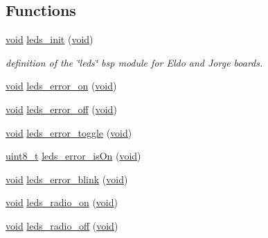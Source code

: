 \subsection*{Functions}
\begin{DoxyCompactItemize}
\item 
\hyperlink{usb__devapi_8h_afabf60e7f57651d6d595a02c75f07cd0}{void} \hyperlink{group__leds_ga67cfc3137a465e560792490e81365254}{leds\+\_\+init} (\hyperlink{usb__devapi_8h_afabf60e7f57651d6d595a02c75f07cd0}{void})
\begin{DoxyCompactList}\small\item\em definition of the \char`\"{}leds\char`\"{} bsp module for Eldo and Jorge boards. \end{DoxyCompactList}\item 
\hyperlink{usb__devapi_8h_afabf60e7f57651d6d595a02c75f07cd0}{void} \hyperlink{group__leds_ga248d93c2ed295c1c463984b881e1b9af}{leds\+\_\+error\+\_\+on} (\hyperlink{usb__devapi_8h_afabf60e7f57651d6d595a02c75f07cd0}{void})
\item 
\hyperlink{usb__devapi_8h_afabf60e7f57651d6d595a02c75f07cd0}{void} \hyperlink{group__leds_ga4639337fca09b91f2136c2843a19e1b3}{leds\+\_\+error\+\_\+off} (\hyperlink{usb__devapi_8h_afabf60e7f57651d6d595a02c75f07cd0}{void})
\item 
\hyperlink{usb__devapi_8h_afabf60e7f57651d6d595a02c75f07cd0}{void} \hyperlink{group__leds_gaa0f84f5b86315c3eed24fc48a826f991}{leds\+\_\+error\+\_\+toggle} (\hyperlink{usb__devapi_8h_afabf60e7f57651d6d595a02c75f07cd0}{void})
\item 
\hyperlink{_p_e___types_8h_aba7bc1797add20fe3efdf37ced1182c5}{uint8\+\_\+t} \hyperlink{group__leds_ga49f878b007c160726b61f01fa6afce85}{leds\+\_\+error\+\_\+is\+On} (\hyperlink{usb__devapi_8h_afabf60e7f57651d6d595a02c75f07cd0}{void})
\item 
\hyperlink{usb__devapi_8h_afabf60e7f57651d6d595a02c75f07cd0}{void} \hyperlink{group__leds_gab68d0db5256aabc4415415f1b33acab5}{leds\+\_\+error\+\_\+blink} (\hyperlink{usb__devapi_8h_afabf60e7f57651d6d595a02c75f07cd0}{void})
\item 
\hyperlink{usb__devapi_8h_afabf60e7f57651d6d595a02c75f07cd0}{void} \hyperlink{group__leds_gabadb9503b7f4bdff557b9f200d52d47e}{leds\+\_\+radio\+\_\+on} (\hyperlink{usb__devapi_8h_afabf60e7f57651d6d595a02c75f07cd0}{void})
\item 
\hyperlink{usb__devapi_8h_afabf60e7f57651d6d595a02c75f07cd0}{void} \hyperlink{group__leds_ga511a7d73ce107a86e36efdf9c8937f96}{leds\+\_\+radio\+\_\+off} (\hyperlink{usb__devapi_8h_afabf60e7f57651d6d595a02c75f07cd0}{void})

\end{DoxyCompactItemize}
